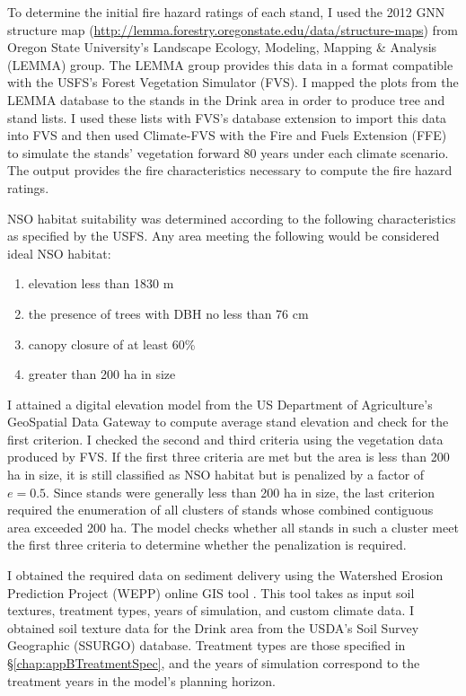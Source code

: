 To determine the initial fire hazard ratings of each stand, I used the 2012 GNN structure map (\url{http://lemma.forestry.oregonstate.edu/data/structure-maps}) from Oregon State University's Landscape Ecology, Modeling, Mapping \& Analysis (LEMMA) group. The LEMMA group provides this data in a format compatible with the USFS's Forest Vegetation Simulator (FVS). I mapped the plots from the LEMMA database to the stands in the Drink area in order to produce tree and stand lists. I used these lists with FVS's database extension to import this data into FVS and then used Climate-FVS with the Fire and Fuels Extension\cite{reinhardt2003fire} (FFE) to simulate the stands' vegetation forward 80 years under each climate scenario. The output provides the fire characteristics necessary to compute the fire hazard ratings.

NSO habitat suitability was determined according to the following characteristics as specified by the USFS. Any area meeting the following would be considered ideal NSO habitat:
\begin{enumerate}
\item elevation less than 1830 m
\item the presence of trees with DBH no less than 76 cm
\item canopy closure of at least 60\%
\item greater than 200 ha in size
\end{enumerate}
I attained a digital elevation model from the US Department of Agriculture's GeoSpatial Data Gateway to compute average stand elevation and check for the first criterion. I checked the second and third criteria using the vegetation data produced by FVS. If the first three criteria are met but the area is less than 200 ha in size, it is still classified as NSO habitat but is penalized by a factor of $e = 0.5$. Since stands were generally less than 200 ha in size, the last criterion required the enumeration of all clusters of stands whose combined contiguous area exceeded 200 ha. The model checks whether all stands in such a cluster meet the first three criteria to determine whether the penalization is required.

I obtained the required data on sediment delivery using the Watershed Erosion Prediction Project (WEPP) online GIS tool \cite{frankenberger2011development}. This tool takes as input soil textures, treatment types, years of simulation, and custom climate data. I obtained soil texture data for the Drink area from the USDA's Soil Survey Geographic (SSURGO) database. Treatment types are those specified in \S \ref{chap:appBTreatmentSpec}, and the years of simulation correspond to the treatment years in the model's planning horizon.

